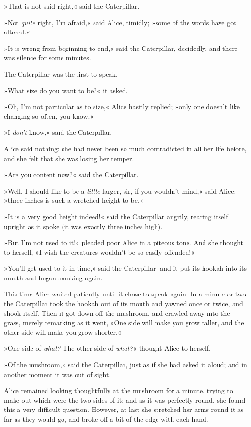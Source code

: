 »That is not said right,« said the Caterpillar.

»Not \textit{quite} right, I'm afraid,« said Alice, timidly; »some of the words have got altered.«

»It is wrong from beginning to end,« said the Caterpillar, decidedly, and there was silence for some minutes.

The Caterpillar was the first to speak.

»What size do you want to be?« it asked.

»Oh, I'm not particular as to size,« Alice hastily replied; »only one doesn't like changing so often, you know.«

»I \textit{don't} know,« said the Caterpillar.

Alice said nothing: she had never been so much contradicted in all her life before, and she felt that she was losing her temper.

»Are you content now?« said the Caterpillar.

»Well, I should like to be a \textit{little} larger, sir, if you wouldn't mind,« said Alice: »three inches is such a wretched height to be.«

»It is a very good height indeed!« said the Caterpillar angrily, rearing itself upright as it spoke (it was exactly three inches high).

»But I'm not used to it!« pleaded poor Alice in a piteous tone. And she thought to herself, »I wish the creatures wouldn't be so easily offended!«

»You'll get used to it in time,« said the Caterpillar; and it put its hookah into its mouth and began smoking again.

This time Alice waited patiently until it chose to speak again. In a minute or two the Caterpillar took the hookah out of its mouth and yawned once or twice, and shook itself. Then it got down off the mushroom, and crawled away into the grass, merely remarking as it went, »One side will make you grow taller, and the other side will make you grow shorter.«

»One side of \textit{what?} The other side of \textit{what?}« thought Alice to herself.

»Of the mushroom,« said the Caterpillar, just as if she had asked it aloud; and in another moment it was out of sight.

Alice remained looking thoughtfully at the mushroom for a minute, trying to make out which were the two sides of it; and as it was perfectly round, she found this a very difficult question. However, at last she stretched her arms round it as far as they would go, and broke off a bit of the edge with each hand.

